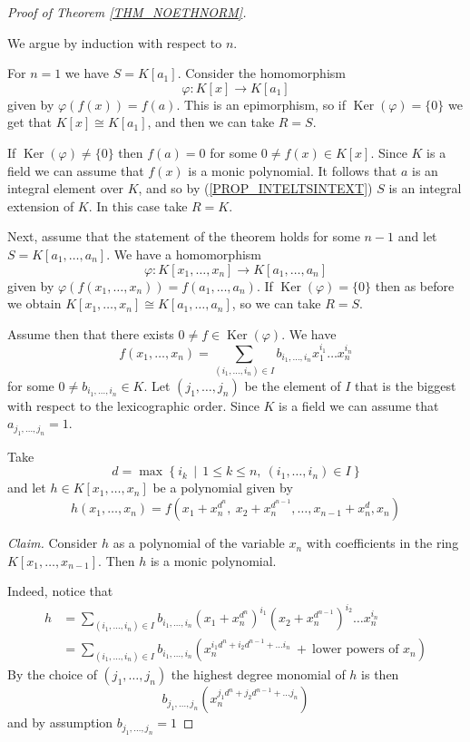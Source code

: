\documentclass[12pt, letterpaper, oneside]{article}
\theoremstyle{plain}
\theoremstyle{definition}
\newcommand{\Ker}{\operatorname{Ker}}
\begin{document}
\begin{proof}[Proof of Theorem \ref{THM_NOETHNORM}] \ 

We argue by induction with respect to $n$. 

For  $n=1$ we have $S=K[a_{1}]$. Consider the homomorphism 
$$\varphi\colon K[x] \to K[a_{1}]$$
given by $\varphi(f(x)) = f(a)$. This is an epimorphism, so  if $\Ker(\varphi) = \{0\}$
we get that $K[x]\cong K[a_{1}]$, and then we can take $R=S$. 

If $\Ker(\varphi) \neq \{0\}$
then $f(a)= 0$ for some $0\neq f(x)\in K[x]$. Since $K$ is a field we can assume that $f(x)$
is a monic polynomial. It follows that $a$ is an integral element over $K$, and so by 
(\ref{PROP_INTELTSINTEXT}) $S$ is an integral extension of $K$. In this case take $R=K$. 
 
 
 
Next, assume that the statement of the theorem holds for some $n-1$ and let $S= K[a_{1}, \dots, a_{n}]$. 
We have a homomorphism 
$$\varphi\colon K[x_{1}, \dots, x_{n}]\to   K[a_{1}, \dots, a_{n}]$$
given by  $\varphi(f(x_{1}, \dots, x_{n})) = f(a_{1}, \dots, a_{n})$. If $\Ker(\varphi) = \{0\}$ then 
as before we obtain   $K[x_{1}, \dots, x_{n}]\cong K[a_{1}, \dots, a_{n}]$, so we can take 
$R = S$. 


Assume then that there exists $0\neq f\in \Ker(\varphi)$. We have 
$$f(x_{1}, \dots, x_{n}) = \sum_{(i_{1}, \dots, i_{n})\in I} b_{i_{1}, \dots, i_{n}}x_{1}^{i_{1}}\dots x_{n}^{i_{n}}$$ 
for some $0\neq b_{i_{1}, \dots, i_{n}}\in K$. Let $(j_{1}, \dots, j_{n})$ be the element of $I$ that 
is the biggest with respect to the lexicographic order. Since $K$ is a field we can assume that 
$a_{j_{1}, \dots, j_{n}} =1$.  

Take  
$$d = \max \ \{\  i_{k} \ \  | \  \  1 \leq k \leq n, \ (i_{1}, \dots, i_{n}) \in I \ \}$$
and let $h\in K[x_{1}, \dots, x_{n}]$ be a polynomial given by 
$$h(x_{1}, \dots, x_{n}) = f(x_{1}+x_{n}^{d^{n}},  \ x_{2} + x_{n}^{d^{n-1}}, \dots, x_{n-1} + x_{n}^{d}, x_{n})$$


\emph{Claim.}
Consider $h$ as a polynomial of the variable $x_{n}$ with coefficients in the ring $K[x_{1}, \dots, x_{n-1}]$. 
Then $h$ is a monic polynomial. 

Indeed, notice that 
\begin{align*}
h & = 
\sum_{(i_{1}, \dots, i_{n})\in I} b_{i_{1}, \dots, i_{n}} (x_{1}+x_{n}^{d^{n}})^{i_{1}} 
(x_{2}+x_{n}^{d^{n-1}})^{i_{2}}\dots x_{n}^{i_{n}} \\
& = \sum_{(i_{1}, \dots, i_{n})\in I} b_{i_{1}, \dots, i_{n}} 
(x_{n}^{i_{1}d^{n}+i_{2}d^{n-1}+ \dots i_{n}} \ +\  \text{lower powers of } x_{n})
\end{align*}
By the choice of $(j_{1}, \dots, j_{n})$ the highest degree monomial of $h$ is then 
$$b_{j_{1}, \dots, j_{n}} (x_{n}^{j_{1}d^{n}+j_{2}d^{n-1}+ \dots j_{n}})$$
and by assumption $b_{j_{1}, \dots, j_{n}}=1$


\end{proof}
\end{document}
